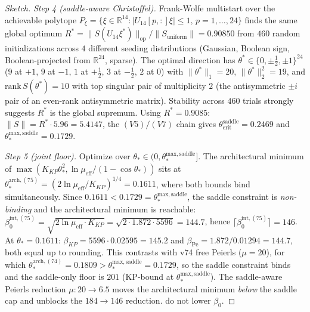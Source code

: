 \documentclass[11pt]{article}
\theoremstyle{definition}
\begin{document}
\begin{proof}[Sketch]
\emph{Step 4 \textup{(}saddle-aware Christoffel\textup{)}.}  Frank-Wolfe
multistart over the achievable polytope
$P_\xi=\{\xi\in\mathbb{R}^{14}:|U_{14}[p,:]\xi|\le 1,\,p=1,\dots,24\}$
finds the same global optimum $R^*=\|S(U_{14}\xi^*)\|_{\mathrm{op}}/
\|S_{\mathrm{uniform}}\|=0.90850$ from $460$ random initializations
across $4$ different seeding distributions \textup{(}Gaussian, Boolean
sign, Boolean-projected from $\mathbb{R}^{24}$, sparse\textup{)}.  The
optimal direction has $\theta^*\in\{0,\pm\tfrac{1}{2},\pm 1\}^{24}$
\textup{(}$9$ at $+1$, $9$ at $-1$, $1$ at $+\tfrac{1}{2}$, $3$ at
$-\tfrac{1}{2}$, $2$ at $0$\textup{)} with
$\|\theta^*\|_1=20$, $\|\theta^*\|_2^2=19$, and
$\mathrm{rank}\,S(\theta^*)=10$ with top singular pair of multiplicity
$2$ \textup{(}the antisymmetric $\pm i$ pair of an even-rank
antisymmetric matrix\textup{)}.  Stability across $460$ trials
strongly suggests $R^*$ is the global supremum.  Using $R^*=0.9085$:
$\|S\|=R^*\cdot 5.96=5.4147$, the $(V5)/(V7)$ chain gives
$\theta_{\mathrm{crit}}^{\mathrm{saddle}}=0.2469$ and
$\theta_*^{\mathrm{max,saddle}}=0.1729$.

\emph{Step 5 \textup{(}joint floor\textup{)}.}  Optimize over
$\theta_*\in(0,\theta_*^{\mathrm{max,saddle}}]$.  The architectural
minimum of $\max(K_{KP}\theta_*^2,\ln\mu_{\mathrm{eff}}/(1-\cos\theta_*))$
sits at $\theta_*^{\mathrm{arch,(75)}}=
(2\ln\mu_{\mathrm{eff}}/K_{KP})^{1/4}=0.1611$, where both bounds
bind simultaneously.  Since $0.1611<0.1729=\theta_*^{\mathrm{max,saddle}}$,
the saddle constraint is \emph{non-binding} and the architectural
minimum is reachable:
$\beta_0^{\mathrm{int,(75)}}=\sqrt{2\ln\mu_{\mathrm{eff}}\cdot K_{KP}}
=\sqrt{2\cdot 1.872\cdot 5596}=144.7$, hence
$\lceil\beta_0^{\mathrm{int,(75)}}\rceil=146$.  At
$\theta_*=0.1611$: $\beta_{KP}=5596\cdot 0.02595=145.2$ and
$\beta_{\mathrm{Pe}}=1.872/0.01294=144.7$, both equal up to
rounding.  This contrasts with v74 free Peierls
\textup{(}$\mu=20$\textup{)}, for which
$\theta_*^{\mathrm{arch,(74)}}=0.1809>\theta_*^{\mathrm{max,saddle}}=0.1729$,
so the saddle constraint binds and the saddle-only floor is $201$
\textup{(}KP-bound at $\theta_*^{\mathrm{max,saddle}}$\textup{)}.
The saddle-aware Peierls reduction $\mu:20\to 6.5$ moves the
architectural minimum \emph{below} the saddle cap and unblocks the
$184\to 146$ reduction.
do not lower $\beta_0$.
\end{proof}
\end{document}
